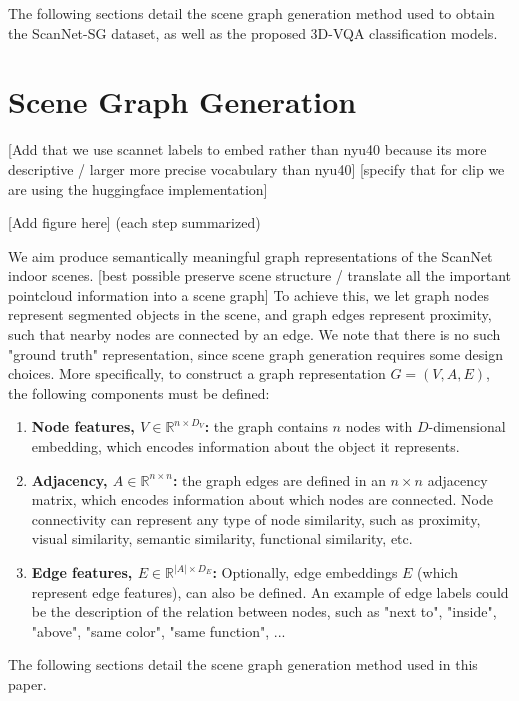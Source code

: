 The following sections detail the scene graph generation method used to obtain the ScanNet-SG dataset, as well as the proposed 3D-VQA classification models.






\section{Scene Graph Generation}

[Add that we use scannet labels to embed rather than nyu40 because its more descriptive / larger more precise vocabulary than nyu40]
[specify that for clip we are using the huggingface implementation]

[Add figure here] (each step summarized)

We aim produce semantically meaningful graph representations of the ScanNet indoor scenes. 
[best possible preserve scene structure / translate all the important pointcloud information into a scene graph]
To achieve this, we let graph nodes represent segmented objects in the scene, and graph edges represent proximity, such that nearby nodes are connected by an edge. We note that there is no such "ground truth" representation, since scene graph generation requires some design choices. More specifically, to construct a graph representation $G = (V, A, E)$, the following components must be defined:

\begin{enumerate}
    \item \textbf{Node features, $V \in \mathbb{R}^{n \times D_V}$: } the graph contains $n$ nodes with $D$-dimensional embedding, which encodes information about the object it represents.
    \item \textbf{Adjacency, $A \in \mathbb{R}^{n \times n}$:} the graph edges are defined in an $n \times n$ adjacency matrix, which encodes information about which nodes are connected. Node connectivity can represent any type of node similarity, such as proximity, visual similarity, semantic similarity, functional similarity, etc.
    \item \textbf{Edge features, $E \in \mathbb{R}^{|A| \times D_E} $: } Optionally, edge embeddings $E$ (which represent edge features), can also be defined. An example of edge labels could be the description of the relation between nodes, such as "next to", "inside", "above", "same color", "same function", ...
\end{enumerate}

The following sections detail the scene graph generation method used in this paper.

